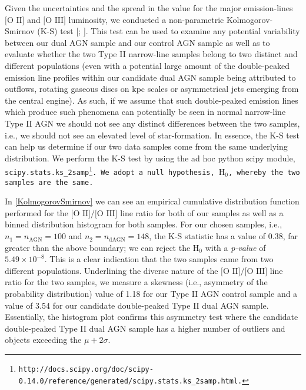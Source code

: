 Given the uncertainties and the spread in the value for the major emission-lines $\text{[O II]}$ and $\text{[O III]}$ luminosity, we conducted a non-parametric Kolmogorov-Smirnov (K-S) test [\cite{Peacock_1983}; \cite{Justel_1997}]. This test can be used to examine any potential variability between our dual AGN sample and our control AGN sample as well as to evaluate whether the two Type II narrow-line samples belong to two distinct and different populations (even with a potential large amount of the double-peaked emission line profiles within our candidate dual AGN sample being attributed to outflows, rotating gaseous discs on kpc scales or asymmetrical jets emerging from the central engine). As such, if we assume that such double-peaked emission lines which produce such phenomena can potentially be seen in normal narrow-line Type II AGN we should not see any distinct differences between the two samples, i.e., we should not see an elevated level of star-formation. In essence, the K-S test can help us determine if our two data samples come from the same underlying distribution. We perform the K-S test by using the ad hoc python scipy module, \tt{scipy.stats.ks_2samp}\footnote{\tiny{\tt{http://docs.scipy.org/doc/scipy-0.14.0/reference/generated/scipy.stats.ks_2samp.html}.}}. We adopt a null hypothesis, $\text{H}_{0}$, whereby the two samples are the same.  

In \ref{KolmogorovSmirnov} we can see an empirical cumulative distribution function  performed for the $\text{[O II]}/\text{[O III]}$ line ratio for both of our samples as well as a binned distribution histogram for both samples. For our chosen samples, i.e., $n_{1}=n_{\text{AGN}}=100$ and $n_{2}=n_{\text{dAGN}}=148$, the K-S statistic has a value of $0.38$, far greater than the above boundary; we can reject the $\text{H}_{0}$ with a \textit{p-value} of $5.49\times10^{-8}$. This is a clear indication that the two samples came from two different populations. Underlining the diverse nature of the $\text{[O II]}/\text{[O III]}$ line ratio for the two samples, we measure a skewness (i.e., asymmetry of the probability distribution) value of 1.18 for our Type II AGN control sample and a value of 3.54 for our candidate double-peaked Type II dual AGN sample. Essentially, the histogram plot confirms this asymmetry test where the candidate double-peaked Type II dual AGN sample has a higher number of outliers and objects exceeding the $\mu+{2\sigma}$.
  
  